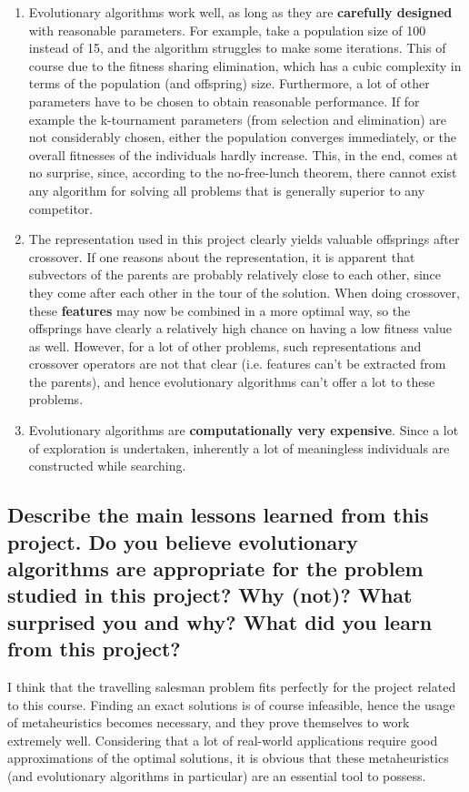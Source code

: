 \documentclass[a4paper,10pt]{article}
\begin{document}
\begin{enumerate}
 \item Evolutionary algorithms work well, as long as they are \textbf{carefully designed} with reasonable parameters. For example, take a population size of 100 instead of 15, and the algorithm struggles to make some iterations. This of course due to the fitness sharing elimination, which has a cubic complexity in terms of the population (and offspring) size. Furthermore, a lot of other parameters have to be chosen to obtain reasonable performance. If for example the k-tournament parameters (from selection and elimination) are not considerably chosen, either the population converges immediately, or the overall fitnesses of the individuals hardly increase. This, in the end, comes at no surprise, since, according to the no-free-lunch theorem, there cannot exist any algorithm for solving all problems that is generally superior to any competitor.
 \item The representation used in this project clearly yields valuable offsprings after crossover. If one reasons about the representation, it is apparent that subvectors of the parents are probably relatively close to each other, since they come after each other in the tour of the solution. When doing crossover, these \textbf{features} may now be combined in a more optimal way, so the offsprings have clearly a relatively high chance on having a low fitness value as well. However, for a lot of other problems, such representations and crossover operators are not that clear (i.e. features can't be extracted from the parents), and hence evolutionary algorithms can't offer a lot to these problems. 
 \item Evolutionary algorithms are \textbf{computationally very expensive}. Since a lot of exploration is undertaken, inherently a lot of meaningless individuals are constructed while searching.
\end{enumerate}

\subsection{Describe the main lessons learned from this project. Do you believe evolutionary algorithms are appropriate for the problem studied in this project? Why (not)? What surprised you and why? What did you learn from this project?}
I think that the travelling salesman problem fits perfectly for the project related to this course. Finding an exact solutions is of course infeasible, hence the usage of metaheuristics becomes necessary, and they prove themselves to work extremely well. Considering that a lot of real-world applications require good approximations of the optimal solutions, it is obvious that these metaheuristics (and evolutionary algorithms in particular) are an essential tool to possess.
\end{document}
